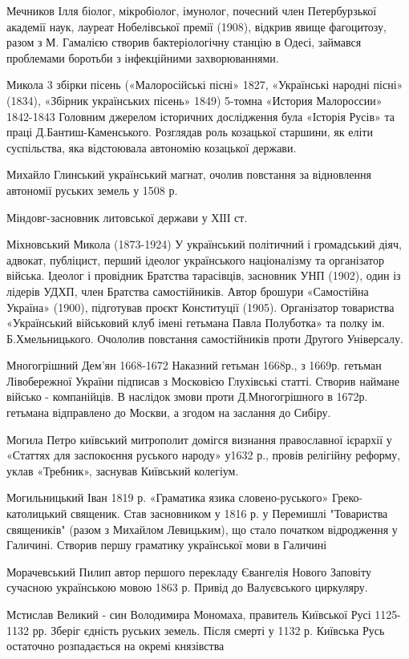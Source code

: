 Мечников Ілля біолог, мікробіолог, імунолог, почесний член Петербурзької академії наук, лауреат Нобелівської премії (1908), відкрив явище фагоцитозу, разом з М. Гамалією створив бактеріологічну станцію в Одесі, займався проблемами боротьби з інфекційними захворюваннями. 

Микола 3 збірки пісень («Малоросійські пісні» 1827, «Українські народні пісні» (1834), «Збірник українських пісень» 1849) 5-томна «История Малороссии» 1842-1843 Головним джерелом історичних дослідження була «Історія Русів» та праці Д.Бантиш-Каменського. Розглядав роль козацької старшини, як еліти суспільства, яка відстоювала автономію козацької держави.

Михайло Глинський український магнат, очолив повстання за відновлення автономії руських земель у 1508 р.

Міндовг-засновник литовської держави у ХІІІ ст.

Міхновський Микола (1873-1924) У український політичний і громадський діяч, адвокат, публіцист, перший ідеолог українського націоналізму та організатор війська. Ідеолог і провідник Братства тарасівців, засновник УНП (1902), один із лідерів УДХП, член Братства самостійників. Автор брошури «Самостійна Україна» (1900), підготував проєкт Конституції (1905). Організатор товариства «Український військовий клуб імені гетьмана Павла Полуботка» та полку ім. Б.Хмельницького. Очололив повстання самостійників проти Другого Універсалу. 

Многогрішний Дем’ян  1668-1672 Наказний гетьман 1668р., з 1669р. гетьман Лівобережної України підписав з Московією Глухівські статті. Створив наймане військо - компанійців. В наслідок змови проти Д.Многогрішного в 1672р. гетьмана відправлено до Москви, а згодом на заслання до Сибіру.

Могила  Петро київський митрополит домігся визнання православної ієрархії у «Статтях для заспокоєння руського народу» у1632 р., провів релігійну реформу, уклав «Требник», заснував Київський колегіум.

Могильницький Іван 1819 р. «Граматика язика словено-руського» Греко-католицький священик. Став засновником у 1816 р. у Перемишлі "Товариства священиків" (разом з Михайлом Левицьким), що стало початком відродження у Галичині. Створив першу граматику української мови в Галичині

Морачевський Пилип автор першого перекладу  Євангелія Нового Заповіту сучасною українською мовою 1863 р. Привід до Валуєвського циркуляру.

Мстислав Великий - син Володимира Мономаха, правитель Київської Русі 1125-1132 рр. Зберіг єдність руських земель. Після смерті у 1132 р. Київська Русь остаточно розпадається на окремі князівства

